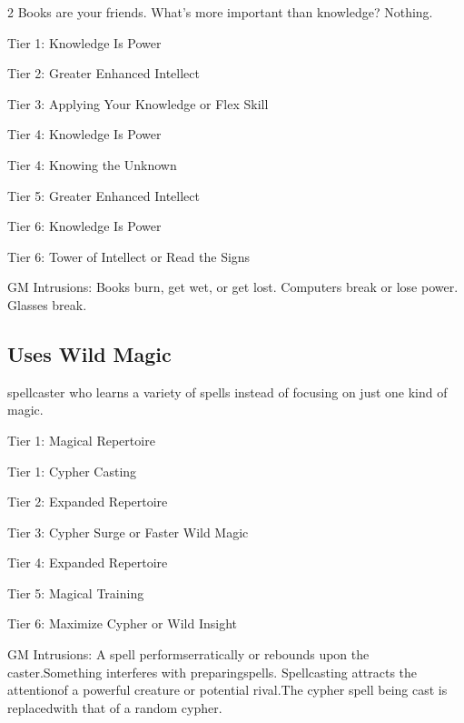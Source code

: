 \begin{multicols}{2}
Books are your friends. What’s more important than knowledge? Nothing.

Tier 1: Knowledge Is Power

Tier 2: Greater Enhanced Intellect

Tier 3: Applying Your Knowledge or Flex Skill

Tier 4: Knowledge Is Power

Tier 4: Knowing the Unknown

Tier 5: Greater Enhanced Intellect

Tier 6: Knowledge Is Power

Tier 6: Tower of Intellect or Read the Signs

GM Intrusions: Books burn, get wet, or get lost. Computers break or lose power. Glasses break.

%
%
%
%
%
%
%
%
%

\subsection{Uses Wild Magic}

 spellcaster who learns a variety of spells instead of focusing on just one kind of magic. 

Tier 1: Magical Repertoire

Tier 1: Cypher Casting

Tier 2: Expanded Repertoire

Tier 3: Cypher Surge or Faster Wild Magic

Tier 4: Expanded Repertoire

Tier 5: Magical Training

Tier 6: Maximize Cypher or Wild Insight

GM Intrusions: A spell performserratically or rebounds upon the caster.Something interferes with preparingspells. Spellcasting attracts the attentionof a powerful creature or potential rival.The cypher spell being cast is replacedwith that of a random cypher.


\end{multicols}
